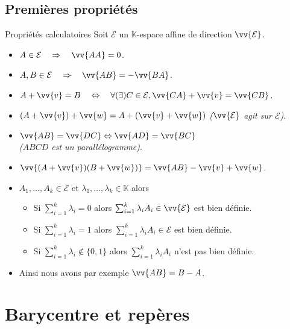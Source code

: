 \documentclass[aspectratio=1610 %
]{beamer}
\newcommand{\myemph}[1]{\textcolor{green!70!black}{\emph{#1}}}
\let\ens\mathcal
\begin{document}
\subsection{Premières propriétés}
  \begin{frame}{Propriétés calculatoires}
    Soit $\ens{E}$ un $\mathbb{K}$-espace affine de direction $\vv{\ens{E}}$.
    \begin{itemize}[<+(1)->]
      \item $A \in \ens{E} \quad\Rightarrow\quad \vv{AA}=0$.
      \item $A,B \in \ens{E} \quad\Rightarrow\quad \vv{AB}=-\vv{BA}$.
      \item $A+\vv{v}=B  \quad\Leftrightarrow\quad \forall (\exists) C \in \ens{E}, \vv{CA}+\vv{v}=\vv{CB}$.
      \item $(A+\vv{v})+\vv{w}=A+(\vv{v}+\vv{w})$ \myemph{($\vv{\ens{E}}$ agit sur $\ens{E}$)}.
      \item $\vv{AB}=\vv{DC} \Leftrightarrow \vv{AD}=\vv{BC}$
        \pause\\\myemph{($ABCD$ est un parallélogramme)}.
      \item $\vv{(A+\vv{v})(B+\vv{w})}=\vv{AB}-\vv{v}+\vv{w}$.
      \item $A_{1},\ldots,A_{k} \in \ens{E}$ et $\lambda_{1},\ldots,\lambda_{k} \in \mathbb{K}$ alors
        \begin{itemize}[<+(1)->]
          \item Si $\sum_{i=1}^{k}\lambda_{i}=0$ alors $\sum_{i=1}^{k}\lambda_{i}A_{i} \in \vv{\ens{E}}$ est bien définie.
          \item Si $\sum_{i=1}^{k}\lambda_{i}=1$ alors $\sum_{i=1}^{k}\lambda_{i}A_{i} \in \ens{E}$ est bien définie.
          \item Si $\sum_{i=1}^{k}\lambda_{i}\notin \{0,1\}$ alors $\sum_{i=1}^{k}\lambda_{i}A_{i}$ n'est pas bien définie.
        \end{itemize}
      \item Ainsi nous avons par exemple $\vv{AB} = B - A$.
    \end{itemize}
  \end{frame}
\section{Barycentre et repères}
\end{document}
